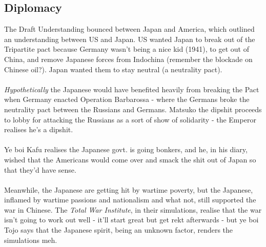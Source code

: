 \documentclass[a4paper]{article}
\begin{document}
\subsection{Diplomacy}
The Draft Understanding bounced between Japan and America, which outlined an understanding between US and Japan. US wanted Japan to break out of the Tripartite pact because Germany wasn't being a nice kid (1941), to get out of China, and remove Japanese forces from Indochina (remember the blockade on Chinese oil?). Japan wanted them to stay neutral (a neutrality pact).\\
\\
\textit{Hypothetically} the Japanese would have benefited heavily from breaking the Pact when Germany enacted Operation Barbarossa - where the Germans broke the neutrality pact between the Russians and Germans. Matsuko the dipshit proceeds to lobby for attacking the Russians as a sort of show of solidarity - the Emperor realises he's a dipshit.\\
\\
Ye boi Kafu realises the Japanese govt. is going bonkers, and he, in his diary, wished that the Americans would come over and smack the shit out of Japan so that they'd have sense.\\
\\
Meanwhile, the Japanese are getting hit by wartime poverty, but the Japanese, inflamed by wartime passions and nationalism and what not, still supported the war in Chinese. The \textit{Total War Institute}, in their simulations, realise that the war isn't going to work out well - it'll start great but get rekt afterwards - but ye boi Tojo says that the Japanese spirit, being an unknown factor, renders the simulations meh.
\end{document}
